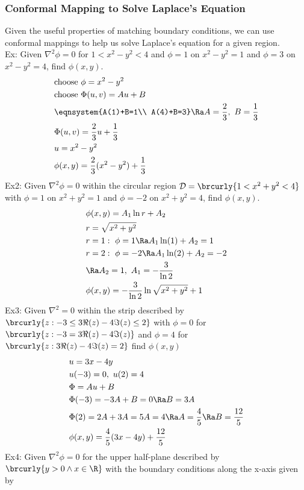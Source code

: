 \subsubsection{Conformal Mapping to Solve Laplace's Equation}
Given the useful properties of matching boundary conditions, we can use conformal mappings to help us solve Laplace's equation for a given region.\\
Ex: Given $\nabla^2\phi=0$ for $1<x^2-y^2<4$ and $\phi=1$ on $x^2-y^2=1$ and $\phi=3$ on $x^2-y^2=4$, find $\phi(x,y)$.
\begin{align*}
    &\text{choose }\phi=x^2-y^2\\
    &\text{choose }\Phi(u,v)=Au+B\\
    &\eqnsystem{A(1)+B=1\\ A(4)+B=3}\Ra A=\frac{2}{3},\ B=\frac{1}{3}\\
    &\Phi(u,v)=\frac{2}{3}u+\frac{1}{3}\\
    &u=x^2-y^2\\
    &\phi(x,y)=\frac{2}{3}(x^2-y^2)+\frac{1}{3}
\end{align*}
Ex2: Given $\nabla^2\phi=0$ within the circular region $\mathcal{D}=\brcurly{1<x^2+y^2<4}$ with $\phi=1$ on $x^2+y^2=1$ and $\phi=-2$ on $x^2+y^2=4$, find $\phi(x,y)$.
\begin{align*}
    &\phi(x,y)=A_1\ln r+A_2\\
    &r=\sqrt{x^2+y^2}\\
    &r=1:\ \phi=1\Ra A_1\ln(1)+A_2=1\\
    &r=2:\ \phi=-2\Ra A_1\ln(2)+A_2=-2\\
    &\Ra A_2=1,\ A_1=-\frac{3}{\ln 2}\\
    &\phi(x,y)=-\frac{3}{\ln 2}\ln\sqrt{x^2+y^2}+1
\end{align*}
Ex3: Given $\nabla^2=0$ within the strip described by $\brcurly{z:-3\leq 3\Re(z)-4\Im(z)\leq 2}$ with $\phi=0$ for $\brcurly{z:-3=3\Re(z)-4\Im(z)}$ and $\phi=4$ for $\brcurly{z:3\Re(z)-4\Im(z)= 2}$ find $\phi(x,y)$
\begin{align*}
    &u=3x-4y\\
    &u(-3)=0,\ u(2)=4\\
    &\Phi=Au+B\\
    &\Phi(-3)=-3A+B=0\Ra B=3A\\
    &\Phi(2)=2A+3A=5A=4\Ra A=\frac{4}{5}\Ra B=\frac{12}{5}\\
    &\phi(x,y)=\frac{4}{5}(3x-4y)+\frac{12}{5}
\end{align*}
Ex4: Given $\nabla^2\phi=0$ for the upper half-plane described by $\brcurly{y>0\wedge x\in\R}$ with the boundary conditions along the x-axis given by
